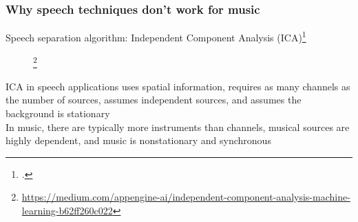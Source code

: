 \documentclass[usenames,dvipsnames]{beamer}
\begin{document}
\begin{frame}
	\frametitle{Why speech techniques don't work for music}
       Speech separation algorithm: Independent Component Analysis (ICA)\footcite{musicsepintro1}
       \begin{figure}
	       \vspace{-1.25em}
	       \footnote{\url{https://medium.com/appengine-ai/independent-component-analysis-machine-learning-b62ff260c022}}
	       \vspace{-0.5em}
       \end{figure}
	ICA in speech applications uses spatial information, requires as many channels as the number of sources, assumes independent sources, and assumes the background is stationary\\
	\vspace{0.15em}
	In music, there are typically more instruments than channels, musical sources are highly dependent, and music is nonstationary and synchronous
\end{frame}
\end{document}

